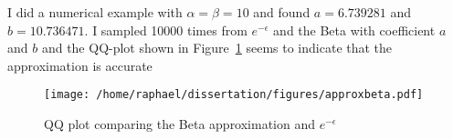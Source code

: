 \documentclass{article}
\begin{document}
I did a numerical example with  $\alpha = \beta = 10$ and found $a = 6.739281$ and $b=10.736471$. I sampled 10000 times from $e^{-\epsilon}$ and the Beta with coefficient $a$ and $b$ and  the QQ-plot shown in Figure~\ref{fig:qq} seems to indicate that the approximation is accurate

\begin{figure}[htb]
	\centering
	\texttt{[image: /home/raphael/dissertation/figures/approxbeta.pdf]}
	\caption{QQ plot comparing the Beta approximation and $e^{-\epsilon}$}
	\label{fig:qq}
\end{figure}

\clearpage
\end{document}
